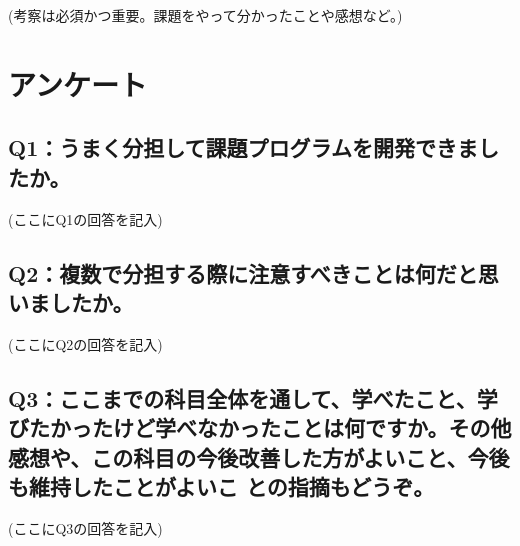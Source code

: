 \documentclass[12pt,a4j]{jarticle}
\begin{document}
(考察は必須かつ重要。課題をやって分かったことや感想など。)

\section{アンケート}

\subsection{Q1：うまく分担して課題プログラムを開発できましたか。}

(ここにQ1の回答を記入)

\subsection{Q2：複数で分担する際に注意すべきことは何だと思いましたか。}

(ここにQ2の回答を記入)

\subsection{Q3：ここまでの科目全体を通して、学べたこと、学びたかったけど学べなかったことは何ですか。その他感想や、この科目の今後改善した方がよいこと、今後も維持したことがよいこ との指摘もどうぞ。}

(ここにQ3の回答を記入)
\end{document}
